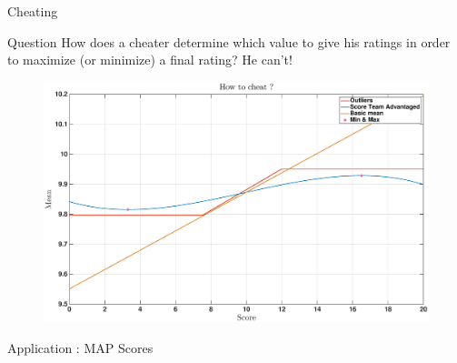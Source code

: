 
\begin{frame}{Cheating}
        \begin{exampleblock}{Question}
            How does a cheater determine which value to give his ratings in order to maximize (or minimize) a final rating? He can't!
        \end{exampleblock}
        
        \begin{figure}
            \centering
            \includegraphics[width=\textwidth]{../rapport/images/cheaters/howto.eps}
        \end{figure}
\end{frame}

\begin{frame}{Application : MAP Scores}

\end{frame}

